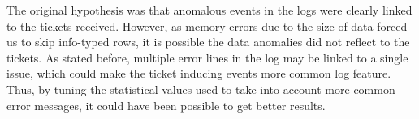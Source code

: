 The original hypothesis was
that anomalous events in the logs
were clearly linked to the tickets received.
However,
as memory errors due to the size of data forced us to skip info-typed rows,
it is possible the data anomalies did not reflect to the tickets.
As stated before,
multiple error lines in the log may be linked to a single issue,
which could make the ticket inducing events
more common log feature.
Thus,
by tuning the statistical values used
to take into account more common error messages,
it could have been possible to get better results.

\clearpage